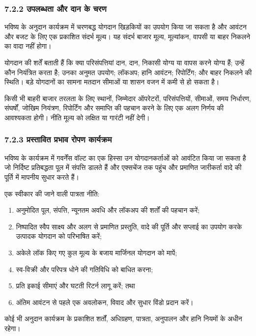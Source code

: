 \documentclass[11pt]{article}
\begin{document}
\subsubsection*{7.2.2 उपलब्धता और दान के चरण}

भविष्य के अनुदान कार्यक्रम में चरणबद्ध योगदान खिड़कियों का उपयोग किया जा सकता है और आवंटन और बजट के लिए एक प्रकाशित संदर्भ मूल्य। यह संदर्भ बाजार मूल्य, मूल्यांकन, वापसी या बाहर निकलने का वादा नहीं होगा।

योगदान की शर्तें बताती हैं कि क्या परिसंपत्तियां दान, दान, निकासी योग्य या वापस करने योग्य हैं; उन्हें कौन नियंत्रित करता है; उनका अनुमत उपयोग; लॉकअप; हानि आवंटन; रिपोर्टिंग; और बाहर निकलने की स्थिति। बड़े योगदानों का सामना मतदान सीमाओं या शासन वजन में कमी से हो सकता है।

किसी भी बाहरी बाजार तरलता के लिए स्थानों, जिम्मेदार ऑपरेटरों, परिसंपत्तियों, सीमाओं, समय निर्धारण, संघर्षों, जोखिम नियंत्रण, रिपोर्टिंग और समाप्ति की पहचान करने के लिए एक अलग निर्णय की आवश्यकता होगी। नीति मूल्य को लक्षित या गारंटी नहीं देगी।

\subsubsection*{7.2.3 प्रस्तावित प्रभाव रोपण कार्यक्रम}

भविष्य के कार्यक्रम में गवर्नेंस वॉल्ट का एक हिस्सा उन योगदानकर्ताओं को आवंटित किया जा सकता है जो निर्दिष्ट प्रतिबद्धता पूल में संपत्ति डालते हैं और एक्सचेंज तक पहुंच और प्रमाणित जारीकर्ता वादे की पूर्ति में मापनीय सुधार करते हैं।

एक स्वीकार की जाने वाली पात्रता नीति:

\begin{enumerate}[leftmargin=*]
\item अनुमोदित पूल, संपत्ति, न्यूनतम अवधि और लॉकअप की शर्तों की पहचान करें;
\item निष्पादित स्वैप साक्ष्य और अलग से प्रमाणित प्रस्तुति, वादे की पूर्ति और सप्लाई का उपयोग करके उत्पादक योगदान को परिभाषित करें;
\item अकेले लॉक किए गए कुल मूल्य के बजाय मार्जिनल योगदान को मापें;
\item स्व-विक्री और परिपत्र धोने की गतिविधि को बाधित करना;
\item प्रति इकाई सीमाएं और घटती रिटर्न लागू करें; तथा
\item अंतिम आवंटन से पहले एक अवलोकन, विवाद और सुधार विंडो प्रदान करें।
\end{enumerate}
कोई भी अनुदान कार्यक्रम के प्रकाशित शर्तों, अधिग्रहण, पात्रता, अनुपालन और हानि नियमों के अधीन रहेगा।
\end{document}
